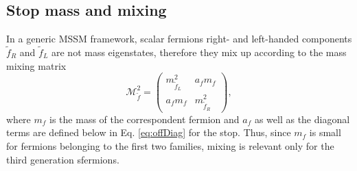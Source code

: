 \subsection{Stop mass and mixing}
In a generic MSSM framework, scalar fermions right- and left-handed components $\tilde{f}_{R}$ and $\tilde{f}_{L}$ are not mass eigenstates, therefore they mix up according to the mass mixing matrix \cite{bartl-1997-73,bartl-1997-76} \begin{equation}\label{eq:massMix}
\mathcal M^{2}_{\tilde{f}} = \left ( \begin{array}{ll}
m^{2}_{\tilde{f}_{L}} & a_{f}m_{f}\\
 a_{f}m_{f} & m^{2}_{\tilde{f}_{R}}
\end{array} \right ),
\end{equation}
where $m_{f}$ is the mass of the correspondent fermion and $a_{f}$ as well as the diagonal terms are defined below in Eq. \ref{eq:offDiag} for the stop. Thus, since $m_{f}$ is small for fermions belonging to the first two families, mixing is relevant only for the third generation sfermions.

